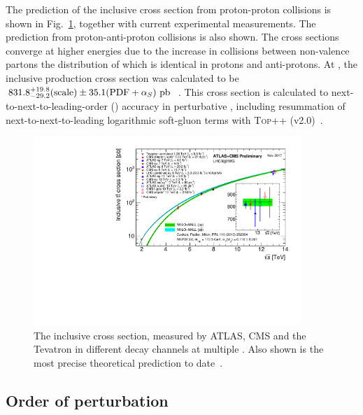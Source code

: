 The prediction of the inclusive \ttbar{} cross section from proton-proton collisions is shown in Fig.~\ref{fig:incttbar}, together with current experimental measurements. 
The prediction from proton-anti-proton collisions is also shown.
The cross sections converge at higher energies due to the increase in collisions between non-valence partons the distribution of which is identical in protons and anti-protons.
At \com{}, the inclusive \ttbar{} production cross section was calculated to be $831.8^{+19.8}_{-29.2}(\text{scale})\pm35.1(\text{PDF}+\alpha_S)\mathrm{~pb}^{}$~\cite{TOPpp}.
This \ttbar{} cross section is calculated to next-to-next-to-leading-order (\NNLO{}) accuracy in perturbative \QCD{}, including resummation of next-to-next-to-leading logarithmic soft-gluon terms with \textsc{Top++} (v2.0)~\cite{Th:XSEC1,Th:XSEC2,Th:XSEC3,Th:XSEC4,Th:XSEC5,Th:XSEC6,Th:XSEC7}.
\begin{figure}[htpb]
	\centering
	\includegraphics[width=0.9\textwidth]{Figures/tt_curve_sqrts_cms}
	\caption[The inclusive \ttbar cross section, measured by ATLAS, CMS and the Tevatron in different decay channels at multiple \sqrts{}. Also shown is the most precise theoretical prediction to date.]{ The inclusive \ttbar cross section, measured by ATLAS, CMS and the Tevatron in different decay channels at multiple \sqrts{}. Also shown is the most precise theoretical prediction to date~\cite{LHCTopWG_Plots}. }
	\label{fig:incttbar}
\end{figure}

\subsection{Order of perturbation} %
\label{sub:order_of_perturbation}

